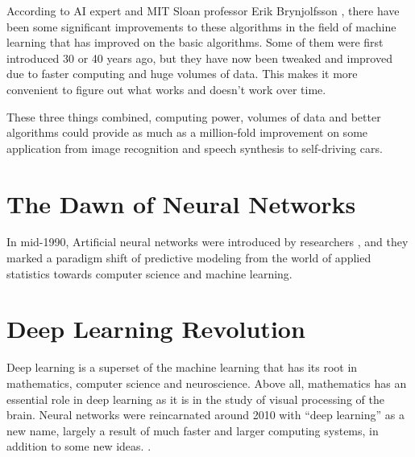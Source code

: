 According to AI expert and MIT Sloan professor Erik Brynjolfsson \cite{hbr_ai_business}, there have been some significant improvements to these algorithms in the field of machine learning that has improved on the basic algorithms. Some of them were first introduced 30 or 40 years ago, but they have now been tweaked and improved due to faster computing and huge volumes of data. This makes it more convenient to figure out what works and doesn't work over time.

These three things combined, computing power, volumes of data and better algorithms could provide as much as a million-fold improvement on some application from image recognition and speech synthesis to self-driving cars.

\section{The Dawn of Neural Networks}
In mid-1990, Artificial neural networks were introduced by researchers \cite{efron2016computer}, and they marked a paradigm shift of predictive modeling from the world of applied statistics towards computer science and machine learning.

\section{Deep Learning Revolution}

Deep learning is a superset of the machine learning that has its root in mathematics, computer science and neuroscience. Above all, mathematics has an essential role in deep learning as it is in the study of visual processing of the brain. Neural networks were reincarnated around 2010 with “deep learning” as a new name, largely a result of much faster and larger computing systems, in addition to some new ideas. \cite{efron2016computer}.

